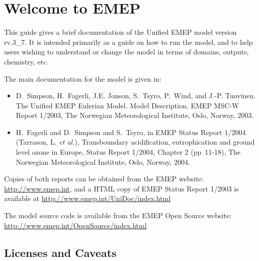 \chapter{Welcome to EMEP }

This guide gives a brief documentation of the Unified EMEP model
version rv.3\_7.
It is intended primarily as a guide on how to run the model, and
to help users wishing to understand or change 
the model in terms of domains, outputs, chemistry, etc.

The main documentation for the model is given in:

\begin{itemize}
\item
D.~Simpson, H.~Fagerli, J.E. Jonson, S.~Tsyro, P.~Wind, and J.-P. Tuovinen.
{The Unified EMEP Eulerian Model. Model Description}.
EMEP MSC-W Report 1/2003, The Norwegian
Meteorological Institute, Oslo, Norway, 2003.
\item
H.~Fagerli and D.~Simpson and S.~Tsyro,
        in EMEP Status Report 1/2004 (Tarrason, L. {\sl et al.}), Transboundary acidification, eutrophication
        and ground level ozone in Europe, Status Report 1/2004, Chapter 2 (pp~11-18), The
        Norwegian Meteorological Institute, Oslo, Norway, 2004. 

\end{itemize}

 Copies of both reports can be obtained from the EMEP website: \\
\url{http://www.emep.int}, and a HTML copy of EMEP Status Report
1/2003 is
available at 
\url{http://www.emep.int/UniDoc/index.html}

The model source code is available from the  EMEP Open Source
  website: \url{http://www.emep.int/OpenSource/index.html}

\section{Licenses and Caveats}


